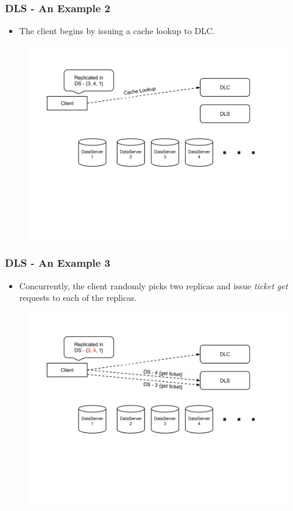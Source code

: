 \documentclass{beamer}
\begin{document}
\begin{frame}
  \frametitle{DLS - An Example 2}
  \begin{itemize}
    \item The client begins by issuing a cache lookup to DLC.
  \end{itemize}
  \begin{figure}
    \begin{center}
      \centerline{\includegraphics[scale=0.40]{img/DLS_Example3.png}}
    \end{center}
  \end{figure}
\end{frame}

\begin{frame}
  \frametitle{DLS - An Example 3}
  \begin{itemize}
    \item Concurrently, the client randomly picks two replicas and
      issue \textit{ticket get} requests to each of the replicas.
  \end{itemize}
  \begin{figure}
    \begin{center}
      \centerline{\includegraphics[scale=0.40]{img/DLS_Example4.png}}
    \end{center}
  \end{figure}
\end{frame}
\end{document}
